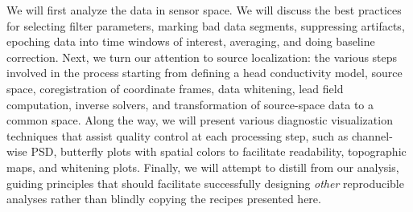 We will first analyze the data in sensor space. We will discuss the best practices for selecting filter parameters, marking bad data segments, suppressing artifacts, epoching data into time windows of interest, averaging, and doing baseline correction. Next, we turn our attention to source localization: the various steps involved in the process starting from defining a head conductivity model, source space, coregistration of coordinate frames, data whitening, lead field computation, inverse solvers, and transformation of source-space data to a common space. Along the way, we will present various diagnostic visualization techniques that assist quality control at each processing step, such as channel-wise \ac{PSD}, butterfly plots with spatial colors to facilitate readability, topographic maps, and whitening plots. Finally, we will attempt to distill from our analysis, guiding principles that should facilitate successfully designing \textit{other} reproducible analyses rather than blindly copying the recipes presented here. 
